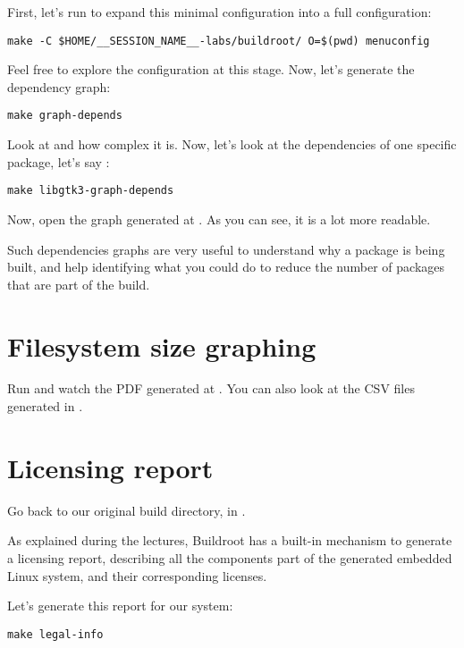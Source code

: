 First, let's run  to expand this minimal
configuration into a full configuration:

\begin{verbatim}
make -C $HOME/__SESSION_NAME__-labs/buildroot/ O=$(pwd) menuconfig
\end{verbatim}

Feel free to explore the configuration at this stage. Now, let's
generate the dependency graph:

\begin{verbatim}
make graph-depends
\end{verbatim}

Look at  and how complex it is. Now,
let's look at the dependencies of one specific package, let's say
:

\begin{verbatim}
make libgtk3-graph-depends
\end{verbatim}

Now, open the graph generated at
. As you can see, it is a lot
more readable.

Such dependencies graphs are very useful to understand why a package
is being built, and help identifying what you could do to reduce the
number of packages that are part of the build.

\section{Filesystem size graphing}

Run  and watch the PDF generated at
. You can also look at the CSV
files generated in .

\section{Licensing report}

Go back to our original build directory, in
.

As explained during the lectures, Buildroot has a built-in mechanism
to generate a licensing report, describing all the components part of
the generated embedded Linux system, and their corresponding licenses.

Let's generate this report for our system:

\begin{verbatim}
make legal-info
\end{verbatim}

